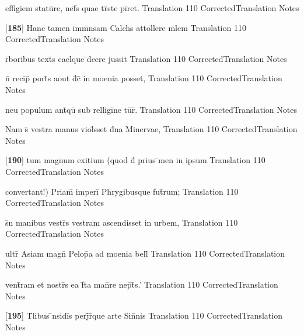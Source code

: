 \latline
  {effigiem statu\={}re, nef\={}s quae tr\={\macron {\i}}ste pi\={}ret.}
  { Translation }
  {110}
  { CorrectedTranslation }
  { Notes }


\latline
  {[\textbf{185}] Hanc tamen imm\={}nsam Calch\={}s attollere m\={}lem}
  { Translation }
  {110}
  { CorrectedTranslation }
  { Notes }


\latline
  {r\={}boribus text\={\macron {\i}}s cael\={}que \={}d\={}cere jussit}
  { Translation }
  {110}
  { CorrectedTranslation }
  { Notes }


\latline
  {n\={} recip\={\macron {\i}} port\={\macron {\i}}s aout d\={}c\={\macron {\i}} in moenia posset,}
  { Translation }
  {110}
  { CorrectedTranslation }
  { Notes }


\latline
  {neu populum ant\={\macron {\i}}qu\={} sub relligi\={}ne tu\={}r\={\macron {\i}}.}
  { Translation }
  {110}
  { CorrectedTranslation }
  { Notes }


\latline
  {Nam s\={\macron {\i}} vestra manus viol\={}sset d\={}na Minervae,}
  { Translation }
  {110}
  { CorrectedTranslation }
  { Notes }


\latline
  {[\textbf{190}] tum magnum exitium (quod d\={\macron {\i}} prius \={}men in ipsum}
  { Translation }
  {110}
  { CorrectedTranslation }
  { Notes }


\latline
  {convertant!) Priam\={\macron {\i}} imperi\={} Phrygibusque fut\={}rum;}
  { Translation }
  {110}
  { CorrectedTranslation }
  { Notes }


\latline
  {s\={\macron {\i}}n manibus vestr\={\macron {\i}}s vestram ascendisset in urbem,}
  { Translation }
  {110}
  { CorrectedTranslation }
  { Notes }


\latline
  {ultr\={} Asiam magn\={} Pelop\={}a ad moenia bell\={}}
  { Translation }
  {110}
  { CorrectedTranslation }
  { Notes }


\latline
  {vent\={}ram et nostr\={}s ea f\={}ta man\={}re nep\={}t\={}s.'}
  { Translation }
  {110}
  { CorrectedTranslation }
  { Notes }


\latline
  {[\textbf{195}] T\={}libus \={\macron {\i}}nsidi\={\macron {\i}}s perj\={}r\={\macron {\i}}que arte Sin\={}nis}
  { Translation }
  {110}
  { CorrectedTranslation }
  { Notes }


